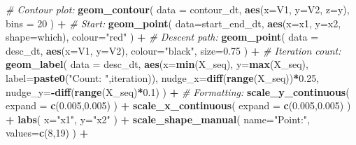 \documentclass[
]{book}
\newenvironment{Shaded}{\begin{snugshade}}{\end{snugshade}}
\newcommand{\CommentTok}[1]{\textcolor[rgb]{0.56,0.35,0.01}{\textit{#1}}}
\newcommand{\DataTypeTok}[1]{\textcolor[rgb]{0.13,0.29,0.53}{#1}}
\newcommand{\DecValTok}[1]{\textcolor[rgb]{0.00,0.00,0.81}{#1}}
\newcommand{\FloatTok}[1]{\textcolor[rgb]{0.00,0.00,0.81}{#1}}
\newcommand{\KeywordTok}[1]{\textcolor[rgb]{0.13,0.29,0.53}{\textbf{#1}}}
\newcommand{\NormalTok}[1]{#1}
\newcommand{\OperatorTok}[1]{\textcolor[rgb]{0.81,0.36,0.00}{\textbf{#1}}}
\newcommand{\StringTok}[1]{\textcolor[rgb]{0.31,0.60,0.02}{#1}}
\begin{document}
\begin{Shaded}
\begin{Highlighting}[]
{\StringTok{  }\CommentTok{# Contour plot:}
\StringTok{  }\KeywordTok{geom_contour}\NormalTok{(}
    \DataTypeTok{data =}\NormalTok{ contour_dt,}
    \KeywordTok{aes}\NormalTok{(}\DataTypeTok{x=}\NormalTok{V1, }\DataTypeTok{y=}\NormalTok{V2, }\DataTypeTok{z=}\NormalTok{y),}
    \DataTypeTok{bins =} \DecValTok{20}
\NormalTok{  ) }\OperatorTok{+}
\StringTok{  }\CommentTok{# Start:}
\StringTok{  }\KeywordTok{geom_point}\NormalTok{(}
    \DataTypeTok{data=}\NormalTok{start_end_dt,}
    \KeywordTok{aes}\NormalTok{(}\DataTypeTok{x=}\NormalTok{x1, }\DataTypeTok{y=}\NormalTok{x2, }\DataTypeTok{shape=}\NormalTok{which),}
    \DataTypeTok{colour=}\StringTok{"red"}
\NormalTok{  ) }\OperatorTok{+}
\StringTok{  }\CommentTok{# Descent path:}
\StringTok{  }\KeywordTok{geom_point}\NormalTok{(}
    \DataTypeTok{data =}\NormalTok{ desc_dt,}
    \KeywordTok{aes}\NormalTok{(}\DataTypeTok{x=}\NormalTok{V1, }\DataTypeTok{y=}\NormalTok{V2),}
    \DataTypeTok{colour=}\StringTok{"black"}\NormalTok{,}
    \DataTypeTok{size=}\FloatTok{0.75}
\NormalTok{  ) }\OperatorTok{+}
\StringTok{  }\CommentTok{# Iteration count:}
\StringTok{  }\KeywordTok{geom_label}\NormalTok{(}
    \DataTypeTok{data =}\NormalTok{ desc_dt,}
    \KeywordTok{aes}\NormalTok{(}\DataTypeTok{x=}\KeywordTok{min}\NormalTok{(X_seq), }\DataTypeTok{y=}\KeywordTok{max}\NormalTok{(X_seq), }\DataTypeTok{label=}\KeywordTok{paste0}\NormalTok{(}\StringTok{"Count: "}\NormalTok{,iteration)),}
    \DataTypeTok{nudge_x=}\KeywordTok{diff}\NormalTok{(}\KeywordTok{range}\NormalTok{(X_seq))}\OperatorTok{*}\FloatTok{0.25}\NormalTok{,}
    \DataTypeTok{nudge_y=}\OperatorTok{-}\KeywordTok{diff}\NormalTok{(}\KeywordTok{range}\NormalTok{(X_seq)}\OperatorTok{*}\FloatTok{0.1}\NormalTok{)}
\NormalTok{  ) }\OperatorTok{+}
\StringTok{  }\CommentTok{# Formatting:}
\StringTok{  }\KeywordTok{scale_y_continuous}\NormalTok{(}
    \DataTypeTok{expand =} \KeywordTok{c}\NormalTok{(}\FloatTok{0.005}\NormalTok{,}\FloatTok{0.005}\NormalTok{)}
\NormalTok{  ) }\OperatorTok{+}
\StringTok{  }\KeywordTok{scale_x_continuous}\NormalTok{(}
    \DataTypeTok{expand =} \KeywordTok{c}\NormalTok{(}\FloatTok{0.005}\NormalTok{,}\FloatTok{0.005}\NormalTok{)}
\NormalTok{  ) }\OperatorTok{+}
\StringTok{  }\KeywordTok{labs}\NormalTok{(}
    \DataTypeTok{x=}\StringTok{"x1"}\NormalTok{,}
    \DataTypeTok{y=}\StringTok{"x2"}
\NormalTok{  ) }\OperatorTok{+}
\StringTok{  }\KeywordTok{scale_shape_manual}\NormalTok{(}
    \DataTypeTok{name=}\StringTok{"Point:"}\NormalTok{,}
    \DataTypeTok{values=}\KeywordTok{c}\NormalTok{(}\DecValTok{8}\NormalTok{,}\DecValTok{19}\NormalTok{)}
\NormalTok{  ) }\OperatorTok{+}
}
\end{Highlighting}
\end{Shaded}
\end{document}
